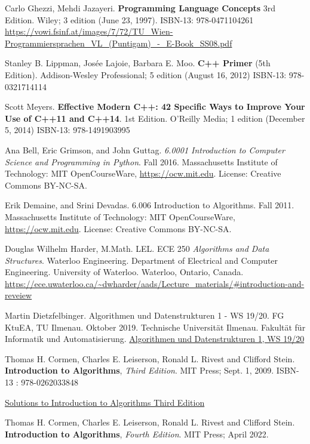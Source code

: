 \documentclass[10pt]{amsart}
\begin{document}
\begin{thebibliography}{9}
Carlo Ghezzi, Mehdi Jazayeri.  \textbf{Programming Language Concepts} 3rd Edition.  Wiley; 3 edition (June 23, 1997).  ISBN-13: 978-0471104261  \url{https://vowi.fsinf.at/images/7/72/TU_Wien-Programmiersprachen_VL_(Puntigam)_-_E-Book_SS08.pdf}

Stanley B. Lippman, Jos\'{e}e Lajoie, Barbara E. Moo. \textbf{C++ Primer} (5th Edition).  Addison-Wesley Professional; 5 edition (August 16, 2012) ISBN-13: 978-0321714114 

Scott Meyers.  \textbf{Effective Modern C++: 42 Specific Ways to Improve Your Use of C++11 and C++14}. 1st Edition.  O'Reilly Media; 1 edition (December 5, 2014)  ISBN-13: 978-1491903995

Ana Bell, Eric Grimson, and John Guttag. \emph{6.0001 Introduction to Computer Science and Programming in Python}. Fall 2016. Massachusetts Institute of Technology: MIT OpenCourseWare, \url{https://ocw.mit.edu}. License: Creative Commons BY-NC-SA.


Erik Demaine, and Srini Devadas. 6.006 Introduction to Algorithms. Fall 2011. Massachusetts Institute of Technology: MIT OpenCourseWare, \url{https://ocw.mit.edu}. License: Creative Commons BY-NC-SA.

Douglas Wilhelm Harder, M.Math. LEL. ECE 250 \emph{Algorithms and Data Structures}. Waterloo Engineering. Department of Electrical and Computer Engineering. University of Waterloo. Waterloo, Ontario, Canada. \url{https://ece.uwaterloo.ca/~dwharder/aads/Lecture_materials/#introduction-and-reveiew}

Martin Dietzfelbinger. Algorithmen und Datenstrukturen 1 - WS 19/20. FG KtuEA, TU Ilmenau. Oktober 2019. Technische Universit\"{a}t Ilmenau. Fakult\"{a}t f\"{u}r Informatik und Automatisierung. \href{https://www.tu-ilmenau.de/en/institute-of-theoretical-computer-science/lehre/lehre-ws-20192020/aud-1/}{Algorithmen und Datenstrukturen 1, WS 19/20}


Thomas H. Cormen, Charles E. Leiserson, Ronald L. Rivest and Clifford Stein.  \textbf{Introduction to Algorithms}, \emph{Third Edition}. MIT Press; Sept. 1, 2009.  ISBN-13 : 978-0262033848 

\href{https://walkccc.me/CLRS/}{Solutions to Introduction to Algorithms Third Edition}

Thomas H. Cormen, Charles E. Leiserson, Ronald L. Rivest and Clifford Stein.  \textbf{Introduction to Algorithms}, \emph{Fourth Edition}. MIT Press; April 2022.


\end{thebibliography}
\end{document}

